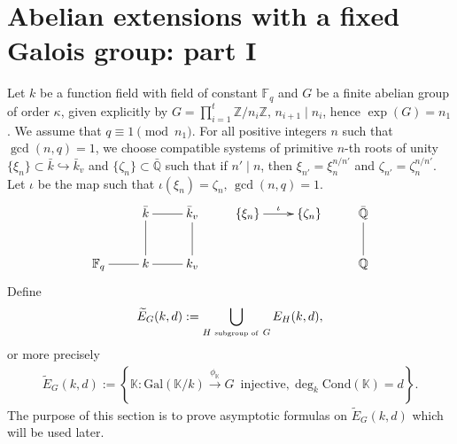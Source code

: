 \documentclass[12pt]{amsart}
\theoremstyle{plain}
\begin{document}
\section{Abelian extensions with a fixed Galois group: part I}

 Let $k$ be a function field with field of constant ${{\mathbb F}_q}$ and $G$ be a finite abelian group of order $\kappa$, given explicitly by $G=\prod_{i=1}^t {{\mathbb Z}}/n_i{{\mathbb Z}}, \, n_{i+1}\mid n_i$, hence $\exp (G)=n_1$. We assume that $q \equiv 1 \pmod{n_1}$. For all positive integers $n$ such that $\gcd(n,q)=1$, we choose compatible systems of primitive $n$-th roots of unity $\{\xi_n\} \subset \bar{k} \hookrightarrow \bar{k}_v$ and $\{\zeta_n\} \subset \bar{{\mathbb Q}}$ such that if $n' \mid n$, then $\xi_{n'}=\xi_n^{n/n'}$ and $\zeta_{n'}=\zeta_n^{n/n'}$. Let $\iota$ be the map such that $\iota(\xi_n)=\zeta_n, \, \gcd(n,q)=1$.
\[\xymatrix{
&{\bar{k}} \ar@{-}[d]\ar@{-}[r] & {{\bar{k}_v}} \ar@{-}[d] & {\{\xi_n\}} \ar[r]^{\iota} &{\{\zeta_n\}} & {\bar{{\mathbb Q}}} \ar@{-}[d] \\
{{\mathbb F}_q} \ar@{-}[r] &{k} \ar@{-}[r]& {k_v}
& {}                                             & {} & {{\mathbb Q}}}\]
Define
\[\widetilde{E}_G(k,d):= \bigcup_{H \,\, \mbox{\tiny subgroup of } \, G}E_H(k,d), \]
or more precisely
\begin{eqnarray} \label{0:egkd} \widetilde{E}_G(k,d):= \left\{{{\mathbb K}}: \mathrm{Gal}({{\mathbb K}}/k) \overset{\phi_{{\mathbb K}}}{\longrightarrow} G \, \mbox{ injective}, \deg_k \mathrm{Cond}({{\mathbb K}})=d\right\}. \end{eqnarray}
The purpose of this section is to prove asymptotic formulas on $\widetilde{E}_G(k,d)$ which will be used later.
\end{document}
